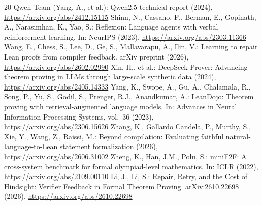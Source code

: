 \documentclass[runningheads,a4paper]{llncs}
\begin{document}
\begin{thebibliography}{20}
 Qwen Team (Yang, A., et al.): Qwen2.5 technical report (2024), \url{https://arxiv.org/abs/2412.15115}
 Shinn, N., Cassano, F., Berman, E., Gopinath, A., Narasimhan, K., Yao, S.: Reflexion: Language agents with verbal reinforcement learning. In: NeurIPS (2023), \url{https://arxiv.org/abs/2303.11366}
 Wang, E., Chess, S., Lee, D., Ge, S., Mallavarapu, A., Ilin, V.: Learning to repair Lean proofs from compiler feedback. arXiv preprint (2026), \url{https://arxiv.org/abs/2602.02990}
 Xin, H., et al.: DeepSeek-Prover: Advancing theorem proving in LLMs through large-scale synthetic data (2024), \url{https://arxiv.org/abs/2405.14333}
 Yang, K., Swope, A., Gu, A., Chalamala, R., Song, P., Yu, S., Godil, S., Prenger, R.J., Anandkumar, A.: LeanDojo: Theorem proving with retrieval-augmented language models. In: Advances in Neural Information Processing Systems, vol.~36 (2023), \url{https://arxiv.org/abs/2306.15626}
 Zhang, K., Gallardo Candela, P., Murthy, S., Xie, Y., Wang, Z., Raissi, M.: Beyond compilation: Evaluating faithful natural-language-to-Lean statement formalization (2026), \url{https://arxiv.org/abs/2606.31002}
 Zheng, K., Han, J.M., Polu, S.: miniF2F: A cross-system benchmark for formal olympiad-level mathematics. In: ICLR (2022), \url{https://arxiv.org/abs/2109.00110}
 Li, J., Li, S.:
Repair, Retry, and the Cost of Hindsight: Verifier Feedback in Formal Theorem
Proving. arXiv:2610.22698 (2026),
\url{https://arxiv.org/abs/2610.22698}
\end{thebibliography}
\end{document}
